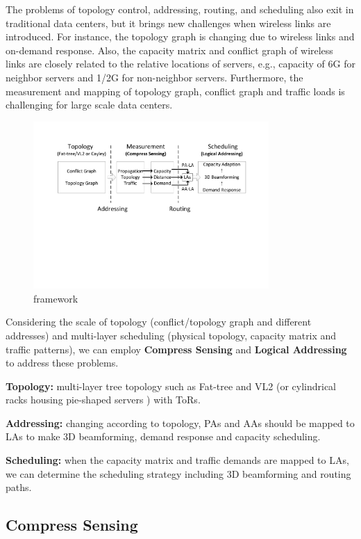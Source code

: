 \documentclass[journal,onecolumn,11pt]{IEEEtran}
\begin{document}
The problems of topology control, addressing, routing, and scheduling also exit in traditional data centers, but it brings new challenges when wireless links are introduced. For instance, the topology graph is changing due to wireless links and on-demand response. Also, the capacity matrix and conflict graph of wireless links are closely related to the relative locations of servers, e.g., capacity of 6G for neighbor servers and 1/2G for non-neighbor servers. Furthermore, the measurement and mapping of topology graph, conflict graph and traffic loads is challenging for large scale data centers.

\begin{figure}[!htp]
\centering
\includegraphics[width=0.8\textwidth]{framework.pdf}
\caption{framework}
\label{framework}
\end{figure}

Considering the scale of topology (conflict/topology graph and different addresses) and multi-layer scheduling (physical topology, capacity matrix and traffic patterns), we can employ \textbf{Compress Sensing} and \textbf{Logical Addressing} to address these problems.

\textbf{Topology:} multi-layer tree topology such as Fat-tree and VL2 (or cylindrical racks housing pie-shaped servers \cite{Shin:2012:FCW:2396556.2396560}) with ToRs.

\textbf{Addressing:} changing according to topology, PAs and AAs should be mapped to LAs to make 3D beamforming, demand response and capacity scheduling.

\textbf{Scheduling:} when the capacity matrix and traffic demands are mapped to LAs, we can determine the scheduling strategy including 3D beamforming and routing paths.


\subsection{Compress Sensing}
\end{document}
